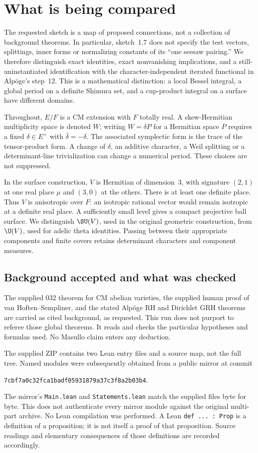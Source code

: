 \documentclass[11pt]{article}
\theoremstyle{definition}\newtheorem{definition}[theorem]{Definition}\newtheorem{remark}[theorem]{Remark}
\begin{document}
\section{What is being compared}
The requested sketch is a map of proposed connections, not a collection of background theorems. In particular, sketch~1.7 does not specify the test vectors, splittings, inner forms or normalizing constants of its ``one seesaw pairing.'' We therefore distinguish exact identities, exact nonvanishing implications, and a still-uninstantiated identification with the character-independent iterated functional in Alp\"oge's step~12. This is a mathematical distinction: a local Bessel integral, a global period on a definite Shimura set, and a cup-product integral on a surface have different domains.

Throughout, $E/F$ is a CM extension with $F$ totally real. A skew-Hermitian multiplicity space is denoted $W$; writing $W=\delta P$ for a Hermitian space $P$ requires a fixed $\delta\in E^\times$ with $\bar\delta=-\delta$. The associated symplectic form is the trace of the tensor-product form. A change of $\delta$, an additive character, a Weil splitting or a determinant-line trivialization can change a numerical period. These choices are not suppressed.

In the surface construction, $V$ is Hermitian of dimension~3, with signature $(2,1)$ at one real place $\mu$ and $(3,0)$ at the others. There is at least one definite place. Thus $V$ is anisotropic over $F$: an isotropic rational vector would remain isotropic at a definite real place. A sufficiently small level gives a compact projective ball surface. We distinguish $\SU(V)$, used in the original geometric construction, from $\U(V)$, used for adelic theta identities. Passing between their appropriate components and finite covers retains determinant characters and component measures.

\subsection{Background accepted and what was checked}
The supplied 032 theorem for CM abelian varieties, the supplied human proof of van Hoften--Sempliner, and the stated Alp\"oge RH and Dirichlet GRH theorems are carried as cited background, as requested. This run does not purport to referee those global theorems. It reads and checks the particular hypotheses and formulas used. No Masullo claim enters any deduction.

The supplied ZIP contains two Lean entry files and a source map, not the full tree. Named modules were subsequently obtained from a public mirror at commit
\begin{center}\small\nolinkurl{7cbf7a0c32fca1badf05931879a37c3f8a2b03b4}.\end{center}
The mirror's \texttt{Main.lean} and \texttt{Statements.lean} match the supplied files byte for byte. This does not authenticate every mirror module against the original multi-part archive. No Lean compilation was performed. A Lean \texttt{def ... : Prop} is a definition of a proposition; it is not itself a proof of that proposition. Source readings and elementary consequences of those definitions are recorded accordingly.
\end{document}
